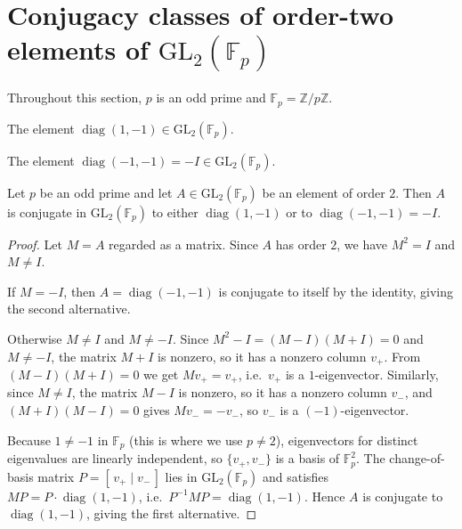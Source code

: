 


\section{Conjugacy classes of order-two elements of \texorpdfstring{$\mathrm{GL}_2(\mathbb{F}_p)$}{GL2(Fp)}}

Throughout this section, $p$ is an odd prime and $\mathbb{F}_p = \mathbb{Z}/p\mathbb{Z}$.

\begin{definition}
  \label{def:gl2-diag-one-neg-one}
  \leanok
  The element $\operatorname{diag}(1, -1) \in \mathrm{GL}_2(\mathbb{F}_p)$.
\end{definition}

\begin{definition}
  \label{def:gl2-diag-neg-one-neg-one}
  \leanok
  The element $\operatorname{diag}(-1, -1) = -I \in \mathrm{GL}_2(\mathbb{F}_p)$.
\end{definition}

\begin{theorem}
  \label{thm:gl2-order-two-classification}
  \leanok
  Let $p$ be an odd prime and let $A \in \mathrm{GL}_2(\mathbb{F}_p)$ be an element of order $2$.
  Then $A$ is conjugate in $\mathrm{GL}_2(\mathbb{F}_p)$ to either $\operatorname{diag}(1, -1)$ or to
  $\operatorname{diag}(-1, -1) = -I$.
\end{theorem}

\begin{proof}
  Let $M = A$ regarded as a matrix. Since $A$ has order $2$, we have $M^2 = I$ and $M \neq I$.

  If $M = -I$, then $A = \operatorname{diag}(-1, -1)$ is conjugate to itself by the identity, giving the second alternative.

  Otherwise $M \neq I$ and $M \neq -I$. Since $M^2 - I = (M - I)(M + I) = 0$ and $M \neq -I$, the matrix
  $M + I$ is nonzero, so it has a nonzero column $v_+$. From $(M - I)(M + I) = 0$ we get
  $M v_+ = v_+$, i.e.\ $v_+$ is a $1$-eigenvector. Similarly, since $M \neq I$, the matrix $M - I$ is
  nonzero, so it has a nonzero column $v_-$, and $(M + I)(M - I) = 0$ gives $M v_- = -v_-$, so $v_-$
  is a $(-1)$-eigenvector.

  Because $1 \neq -1$ in $\mathbb{F}_p$ (this is where we use $p \neq 2$), eigenvectors for distinct
  eigenvalues are linearly independent, so $\{v_+, v_-\}$ is a basis of $\mathbb{F}_p^2$. The change-of-basis
  matrix $P = [\,v_+ \mid v_-\,]$ lies in $\mathrm{GL}_2(\mathbb{F}_p)$ and satisfies
  $M P = P \cdot \operatorname{diag}(1, -1)$, i.e.\ $P^{-1} M P = \operatorname{diag}(1, -1)$. Hence
  $A$ is conjugate to $\operatorname{diag}(1, -1)$, giving the first alternative.
\end{proof}


